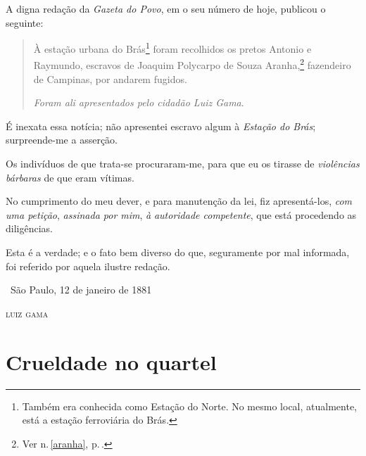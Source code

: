 A digna redação da \emph{Gazeta do Povo}, em o seu número de hoje,
publicou o seguinte:

\begin{quote}
À estação urbana do Brás\footnote{Também era conhecida como Estação
  do Norte. No mesmo local, atualmente, está a estação ferroviária do
  Brás.} foram recolhidos os pretos Antonio e Raymundo, escravos de
Joaquim Polycarpo de Souza Aranha,\footnote{Ver n.\,\ref{aranha}, p.\,\pageref{aranha}.}
fazendeiro de Campinas, por
andarem fugidos.

\emph{Foram ali apresentados pelo cidadão Luiz Gama}.
\end{quote}

É inexata essa notícia; não apresentei escravo algum à \emph{Estação do
Brás}; surpreende-me a asserção.

Os indivíduos de que trata-se procuraram-me, para que eu os tirasse de
\emph{violências bárbaras} de que eram vítimas.

No cumprimento do meu dever, e para manutenção da lei, fiz
apresentá-los, \emph{com uma petição}, \emph{assinada por mim}, \emph{à}
\emph{autoridade competente}, que está procedendo as diligências.

Esta é a verdade; e o fato bem diverso do que, seguramente por mal
informada, foi referido por aquela ilustre redação.

\medskip

\hfill\ São Paulo, 12 de janeiro de 1881

\hfill\textsc{luiz gama}

\part{Crueldade no quartel}

